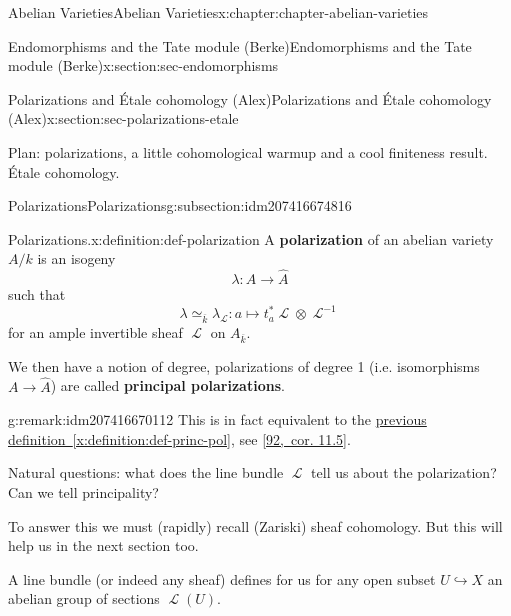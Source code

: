 \documentclass[oneside,10pt,]{book}
\newcommand{\terminology}[1]{\textbf{#1}}
\numberwithin{equation}{section}
\newcommand{\sheaf}[1]{\operatorname{\mathcal{#1}}}
\begin{document}
\begin{chapterptx}{Abelian Varieties}{}{Abelian Varieties}{}{}{x:chapter:chapter-abelian-varieties}
\begin{sectionptx}{Endomorphisms and the Tate module (Berke)}{}{Endomorphisms and the Tate module (Berke)}{}{}{x:section:sec-endomorphisms}
\end{sectionptx}
%
%
\typeout{************************************************}
\typeout{************************************************}
%
\begin{sectionptx}{Polarizations and Étale cohomology (Alex)}{}{Polarizations and Étale cohomology (Alex)}{}{}{x:section:sec-polarizations-etale}
\begin{introduction}{}%
Plan: polarizations, a little cohomological warmup and a cool finiteness result. Étale cohomology.%
\end{introduction}%
%
%
\typeout{************************************************}
\typeout{************************************************}
%
\begin{subsectionptx}{Polarizations}{}{Polarizations}{}{}{g:subsection:idm207416674816}
\begin{definition}{Polarizations.}{x:definition:def-polarization}%
A \terminology{polarization} of an abelian variety \(A/k\) is an isogeny%
\begin{equation*}
\lambda \colon A \to \hat A
\end{equation*}
such that%
\begin{equation*}
\lambda \simeq_{\overline k} \lambda_{\sheaf{L}} : a\mapsto t_a^*\sheaf L \otimes \sheaf L^{-1}
\end{equation*}
for an ample invertible sheaf \(\sheaf L\) on \(A_{\overline k}\).%
\par
We then have a notion of degree, polarizations of degree 1 (i.e. isomorphisms \(A\to \hat A\)) are called \terminology{principal polarizations}.%
\end{definition}
\begin{remark}{}{g:remark:idm207416670112}%
This is in fact equivalent to the \hyperref[x:definition:def-princ-pol]{previous definition~\ref{x:definition:def-princ-pol}}, see \hyperlink{x:biblio:bib-vandergeer-moonen}{[92,~cor. 11.5]}.%
\end{remark}
Natural questions: what does the line bundle \(\sheaf L\) tell us about the polarization? Can we tell principality?%
\par
To answer this we must (rapidly) recall (Zariski) sheaf cohomology. But this will help us in the next section too.%
\par
A line bundle (or indeed any sheaf) defines for us for any open subset \(U \hookrightarrow X\) an abelian group of sections \(\sheaf L(U)\).%

\end{subsectionptx}
\end{sectionptx}
\end{chapterptx}
\end{document}

